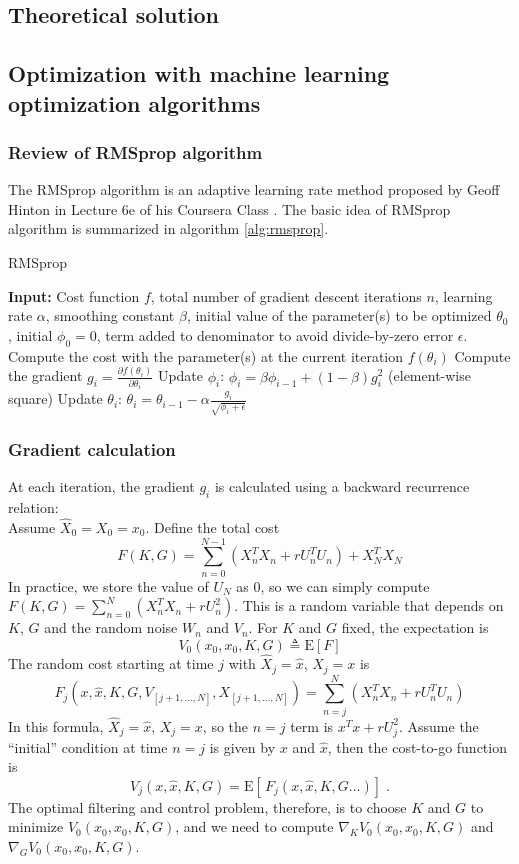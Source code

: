 \documentclass{article}
\begin{document}
\subsection{Theoretical solution}
\subsection{Optimization with machine learning optimization algorithms}
\subsubsection{Review of RMSprop algorithm}
The RMSprop algorithm is an adaptive learning rate method proposed by Geoff Hinton in Lecture 6e of his Coursera Class \cite{tieleman2012lecture}. The basic idea of RMSprop algorithm is summarized in algorithm \ref{alg:rmsprop}.
\begin{algorithm}
	\caption{RMSprop}
	\begin{algorithmic}
		\State \textbf{Input:} Cost function $f$, total number of gradient descent iterations $n$, learning rate $\alpha$, smoothing constant $\beta$, initial value of the parameter(s) to be optimized $\theta_0$, initial $\phi_0 = 0$, term added to denominator to avoid divide-by-zero error $\epsilon$.
		\State Compute the cost with the parameter(s) at the current iteration $f(\theta_i)$
		\State Compute the gradient $g_i = \frac{\partial f(\theta_i)}{\partial \theta_i}$
		\State Update $\phi_i$: $\phi_i = \beta \phi_{i-1} + (1-\beta) g^2_i$ (element-wise square)
		\State Update $\theta_i$: $\theta_i = \theta_{i-1} - \alpha\frac{g_i}{\sqrt{\phi_i + \epsilon}}$
		\EndFor
	\end{algorithmic}
	\label{alg:rmsprop}
\end{algorithm}

\subsubsection{Gradient calculation}
At each iteration, the gradient $g_i$ is calculated using a backward recurrence relation:\\
Assume $\widehat{X}_0 = X_0 = x_0$. Define the total cost
\[
F(K,G) = \sum_{n=0}^{N-1} (X_n^T X_n + r U_n^T U_n) + X_N^T X_N
\]
In practice, we store the value of $U_N$ as 0, so we can simply compute $F(K,G) = \sum_{n=0}^{N} (X_n^T X_n + rU_n^2)$. This is a random variable that depends on $K$, $G$ and the random noise $W_n$ and $V_n$.
For $K$ and $G$ fixed, the expectation is 
\[
V_0(x_0,x_0,K,G) \triangleq \text{E}\left[F \right]
\]
The random cost starting at time $j$ with $\widehat{X}_j = \widehat{x}$, $X_j = x$ is
\[
F_j(x, \widehat{x},K,G, V_{[j+1,\ldots,N]},X_{[j+1,\ldots,N]}) = \sum_{n=j}^N (X_n^T X_n + rU_n^T U_n)
\]
In this formula, $\widehat{X}_j = \widehat{x}$, $X_j = x$, so the $n=j$ term is $x^T x + rU_j^2$.
Assume the ``initial'' condition at time $n=j$ is given by $x$ and $\widehat{x}$, then the cost-to-go function is 
\[
V_j(x,\widehat{x},K,G) = \text{E} \!\left[\, F_j(x,\widehat{x},K,G\ldots)\right] \; .
\]
The optimal filtering and control problem, therefore, is to choose $K$ and $G$ to minimize $V_0(x_0,x_0,K,G)$, and we need to compute $\nabla_K V_0(x_0,x_0,K,G)$ and $\nabla_G V_0(x_0,x_0,K,G)$.
\end{document}
